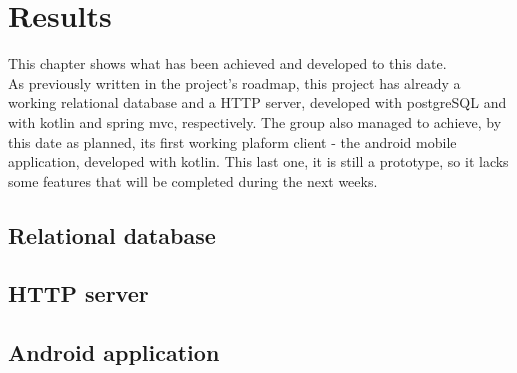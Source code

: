%
%
\chapter{Results}

This chapter shows what has been achieved and developed to this date.\\

As previously written in the project's roadmap, this project has already a working relational database
and a HTTP server, developed with postgreSQL and with kotlin and spring mvc, respectively. The group also
managed to achieve, by this date as planned, its first working plaform client - the android mobile application, developed
with kotlin. This last one, it is still a prototype, so it lacks some features that will be completed during the next weeks.

\section{Relational database}

\section{HTTP server}

\section{Android application}